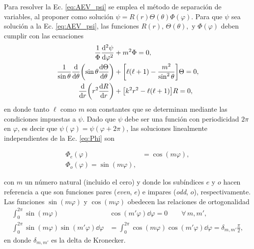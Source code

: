 	
Para resolver la Ec. \eqref{eq:AEV_psi} se emplea el método de separación de variables, al proponer como solución $\psi= R(r)\Theta(\theta) \Phi(\varphi)$. Para que $\psi$ sea solución a la Ec.  \eqref{eq:AEV_psi}, las funciones $R(r),\, \Theta(\theta), \mbox{ y } \Phi(\varphi)$ deben cumplir con las ecuaciones
	\begin{align}
	\frac{1}{\Phi}\dv[2]{\psi}{\varphi} &+ m^2 \Phi =0, \label{eq:Phi}\\
	\frac{1}{\sin\theta}\dv{\theta}\qty(\sin\theta\dv{\Theta}{\theta}) &+ 	\qty[\ell(\ell+1)- \frac{m^2}{\sin^2\theta}]\Theta =0,\label{eq:Theta}\\
	\dv{r}\qty(r^2\dv{R}{r}) &+ \qty[ k^2 r^2 - \ell (\ell +1)] R =0, 	\label{eq:Req}
	\end{align}
en donde tanto $\ell$  como $m$ son constantes que se determinan mediante las condiciones impuestas a $\psi$. Dado que $\psi$ debe ser una función con periodicidad $2\pi$ en $\varphi$, es decir que $\psi(\varphi) = \psi(\varphi+2\pi)$, las soluciones linealmente independientes de la Ec. \eqref{eq:Phi} son 

	\begin{subequations}
	\begin{align}
	\Phi_e(\varphi) &= \cos(m\varphi),\\
	\Phi_o(\varphi) = \sin(m\varphi),
	\end{align}
	\label{eq:SinCos} 
	\end{subequations} \vspace{-1em}
	
\noindent con $m$ un número natural (incluido el cero) y donde los subíndices $e$ y $o$ hacen referencia a que son funciones pares (\emph{even}, $e$) e impares (\emph{odd}, $o$), respectivamente. Las funciones $\sin(m\varphi)$ y $\cos(m\varphi)$ obedecen las relaciones de ortogonalidad
 	\begin{subequations}
	\begin{align}
	\int_0^{2\pi} \sin(m\varphi) &\cos(m' \varphi) \dd\varphi = 0 \qquad \forall\, m,m',\label{seq:ortSinCos}\\
	\int_0^{2\pi} \sin(m\varphi) \sin(m'\varphi)\dd\varphi &=  \int_0^{2\pi} \cos(m\varphi) \cos(m'\varphi)\dd\varphi  = \delta_{m,m'}\frac{\pi}{2},\label{seq:ortCos2}
	\end{align}\label{eq:ortSinCos}
 	\end{subequations}
en donde $\delta_{m,m'}$ es la delta de Kronecker.

